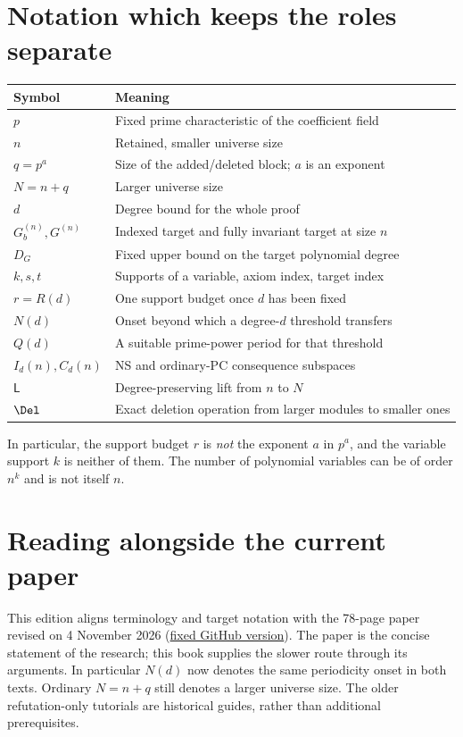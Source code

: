 \documentclass[11pt,a4paper,oneside,openany]{book}
\theoremstyle{definition}\newtheorem{definition}[theorem]{Definition}
\theoremstyle{remark}\newtheorem{remark}[theorem]{Remark}
\numberwithin{equation}{chapter}
\begin{document}
\section*{Notation which keeps the roles separate}
\begin{center}
\begin{tabular}{@{}ll@{}}
\toprule
Symbol & Meaning\\
\midrule
$p$ & Fixed prime characteristic of the coefficient field\\
$n$ & Retained, smaller universe size\\
$q=p^a$ & Size of the added/deleted block; $a$ is an exponent\\
$N=n+q$ & Larger universe size\\
$d$ & Degree bound for the whole proof\\
$G_b^{(n)},G^{(n)}$ & Indexed target and fully invariant target at size $n$\\
$D_G$ & Fixed upper bound on the target polynomial degree\\
$k,s,t$ & Supports of a variable, axiom index, target index\\
$r=R(d)$ & One support budget once $d$ has been fixed\\
$N(d)$ & Onset beyond which a degree-$d$ threshold transfers\\
$Q(d)$ & A suitable prime-power period for that threshold\\
$I_d(n),C_d(n)$ & NS and ordinary-PC consequence subspaces\\
$\mathsf L$ & Degree-preserving lift from $n$ to $N$\\
$\Del$ & Exact deletion operation from larger modules to smaller ones\\
\bottomrule
\end{tabular}
\end{center}
In particular, the support budget $r$ is \emph{not} the exponent $a$
in $p^a$, and the variable support $k$ is neither of them. The number
of polynomial variables can be of order $n^k$ and is not itself $n$.

\section*{Reading alongside the current paper}
This edition aligns terminology and target notation with the
78-page paper revised on 4 November 2026
(\href{https://github.com/SR123/degree-profiles-linear-bounds/blob/9e7cea1064f28f7e2ffd5eab44d52bfa854c5baa/paper/paper.pdf}{fixed GitHub version}). The paper
is the concise statement of the research; this book supplies the slower
route through its arguments. In particular $N(d)$ now denotes the
same periodicity onset in both texts. Ordinary $N=n+q$ still denotes
a larger universe size. The older refutation-only tutorials are
historical guides, rather than additional prerequisites.
\end{document}
